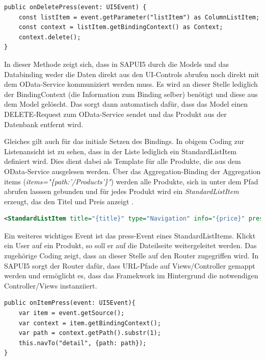 \begin{lstlisting}[emph={event, UI5Event, listItem},  caption=Auszüge aus der Controller \texttt{Main.control.ts}]
public onDeletePress(event: UI5Event) {
    const listItem = event.getParameter("listItem") as ColumnListItem;
    const context = listItem.getBindingContext() as Context;
    context.delete();
} 
\end{lstlisting}

In dieser Methode zeigt sich, dass in SAPUI5 durch die Models und das Databinding weder die Daten direkt aus den UI-Controls abrufen noch direkt mit dem OData-Service kommuniziert werden muss. Es wird an dieser Stelle lediglich der BindingContext (die Information zum Binding selber) benötigt und diese aus dem Model gelöscht. Das sorgt dann automatisch dafür, dass das Model einen DELETE-Request zum OData-Service sendet und das Produkt aus der Datenbank entfernt wird.

Gleiches gilt auch für das initiale Setzen des Bindings. In obigem Coding zur Listenansicht ist zu sehen, dass in der Liste lediglich ein StandardListItem definiert wird. Dies dient dabei als Template für alle Produkte, die aus dem OData-Service ausgelesen werden. Über das Aggregation-Binding der Aggregation items (\textit{items="\{path:'/Products'\}"}) werden alle Produkte, sich in unter dem Pfad abrufen lasssen gebunden und für jedes Produkt wird ein \textit{StandardListItem} erzeugt, das den Titel und Preis anzeigt \cite{sud:s19}.

\begin{lstlisting}[language=XML,  caption=Auszüge aus der View \texttt{Main.view.xml}]
<StandardListItem title="{title}" type="Navigation" info="{price}" press="onItemPress"/>
\end{lstlisting}

Ein weiteres wichtiges Event ist das press-Event eines StandardListItems. Klickt ein User auf ein Produkt, so soll er auf die Dateilseite weitergeleitet werden. Das zugehörige Coding zeigt, dass an dieser Stelle auf den Router zugegriffen wird. In SAPUI5 sorgt der Router dafür, dass URL-Pfade auf Views/Controller gemappt werden und ermöglicht es, dass das Framekwork im Hintergrund die notwendigen Controller/Views instanziiert.

\begin{lstlisting}[emph={event, UI5Event, listItem, detail, path}, caption=Auszüge aus der Controller \texttt{Main.control.ts}]
public onItemPress(event: UI5Event){
    var item = event.getSource();
    var context = item.getBindingContext();
    var path = context.getPath().substr(1);
    this.navTo("detail", {path: path});
}
\end{lstlisting}

